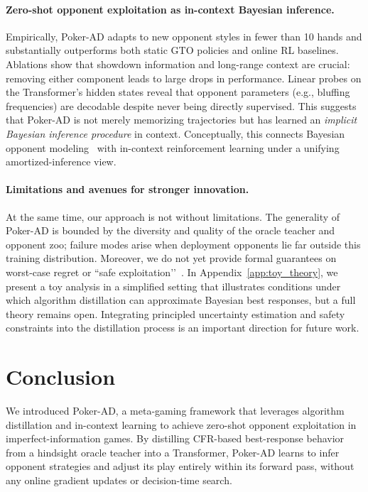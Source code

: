 \documentclass{article}
\begin{document}
\paragraph{Zero-shot opponent exploitation as in-context Bayesian inference.}
Empirically, Poker-AD adapts to new opponent styles in fewer than 10 hands and substantially outperforms both static GTO policies and online RL baselines. Ablations show that showdown information and long-range context are crucial: removing either component leads to large drops in performance. Linear probes on the Transformer's hidden states reveal that opponent parameters (e.g., bluffing frequencies) are decodable despite never being directly supervised. This suggests that Poker-AD is not merely memorizing trajectories but has learned an \emph{implicit Bayesian inference procedure} in context. Conceptually, this connects Bayesian opponent modeling~\citep{southey2005bayesbluff,ganzfried2018bayesian} with in-context reinforcement learning under a unifying amortized-inference view.

\paragraph{Limitations and avenues for stronger innovation.}
At the same time, our approach is not without limitations. The generality of Poker-AD is bounded by the diversity and quality of the oracle teacher and opponent zoo; failure modes arise when deployment opponents lie far outside this training distribution. Moreover, we do not yet provide formal guarantees on worst-case regret or ``safe exploitation’’~\citep{ganzfried2018bayesian}. In Appendix~\ref{app:toy_theory}, we present a toy analysis in a simplified setting that illustrates conditions under which algorithm distillation can approximate Bayesian best responses, but a full theory remains open. Integrating principled uncertainty estimation and safety constraints into the distillation process is an important direction for future work.

\section{Conclusion}
\label{sec:conclusion}

We introduced Poker-AD, a meta-gaming framework that leverages algorithm distillation and in-context learning to achieve zero-shot opponent exploitation in imperfect-information games. By distilling CFR-based best-response behavior from a hindsight oracle teacher into a Transformer, Poker-AD learns to infer opponent strategies and adjust its play entirely within its forward pass, without any online gradient updates or decision-time search.
\end{document}
